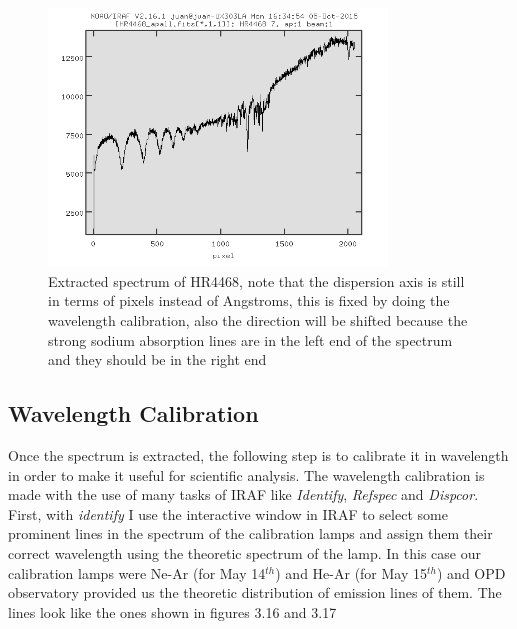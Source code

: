 \begin{figure}[H]
\centering
\includegraphics[width=9cm]{images/calib_star_apall.png}
\caption[Spectrum of calibration star HR4468]{Extracted spectrum of HR4468, note that the dispersion axis is still in terms of pixels instead of Angstroms, this is fixed by doing the wavelength calibration, also the direction will be shifted because the strong sodium absorption lines are in the left end of the spectrum and they should be in the right end}
\end{figure}

\subsection{Wavelength Calibration}

Once the spectrum is extracted, the following step is to calibrate it in wavelength in order to make it useful for scientific analysis. The wavelength calibration is made with the use of many tasks of IRAF like \textit{Identify}, \textit{Refspec} and \textit{Dispcor}. First, with \textit{identify} I use the interactive window in IRAF to select some prominent lines in the spectrum of the calibration lamps and assign them their correct wavelength using the theoretic spectrum of the lamp. In this case our calibration lamps were Ne-Ar (for May 14$^{th}$) and He-Ar (for May 15$^{th}$)  and OPD observatory provided us the theoretic distribution of emission lines of them. The lines look like the ones shown in figures 3.16 and 3.17

